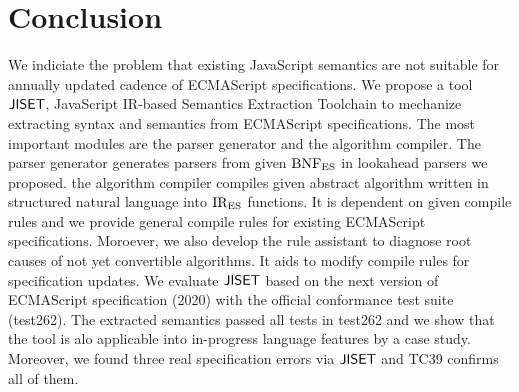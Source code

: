 \section{Conclusion}\label{sec:conclude}

We indiciate the problem that existing JavaScript semantics are not suitable for
annually updated cadence of ECMAScript specifications. We propose a tool \( \text{\sf JISET} \),
JavaScript IR-based Semantics Extraction Toolchain to mechanize extracting syntax
and semantics from ECMAScript specifications. The most important modules are
the parser generator and the algorithm compiler. The parser generator generates
parsers from given \( \text{BNF}_{\text{ES}} \) in lookahead parsers we proposed. the algorithm
compiler compiles given abstract algorithm written in structured natural language
into \( \text{IR}_\text{ES} \) functions. It is dependent on given compile rules and we provide
general compile rules for existing ECMAScript specifications. Moroever, we also
develop the rule assistant to diagnose root causes of not yet convertible algorithms.
It aids to modify compile rules for specification updates. We evaluate \( \text{\sf JISET} \)
based on the next version of ECMAScript specification (2020) with the official conformance test
suite (test262). The extracted semantics passed all  tests in test262
and we show that the tool is alo applicable into in-progress language features
by a case study. Moreover, we found three real specification errors via \( \text{\sf JISET} \)
and TC39 confirms all of them.

